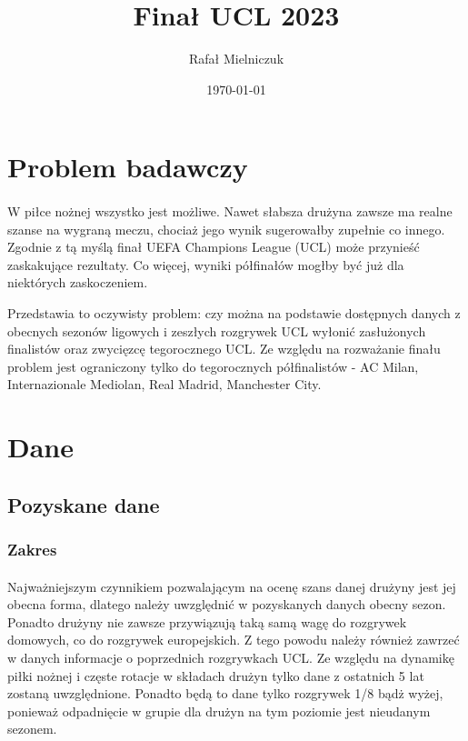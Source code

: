 \documentclass[12pt, letterpaper]{article}
\title{\textbf{Finał UCL 2023}}
\author{Rafał Mielniczuk}
\date{\today}
\begin{document}
\maketitle

\tableofcontents
\pagebreak


\section{Problem badawczy}
\paragraph{} W piłce nożnej wszystko jest możliwe. Nawet słabsza drużyna zawsze ma realne szanse na wygraną meczu, chociaż jego wynik sugerowałby zupełnie co innego. Zgodnie z tą myślą finał UEFA Champions League (UCL) może przynieść zaskakujące rezultaty. Co więcej, wyniki półfinałów mogłby być już dla niektórych zaskoczeniem. \par Przedstawia to oczywisty problem: czy można na podstawie dostępnych danych z obecnych sezonów ligowych i zeszłych rozgrywek UCL wyłonić zasłużonych finalistów oraz zwycięzcę tegorocznego UCL. Ze względu na rozważanie finału problem jest ograniczony tylko do tegorocznych półfinalistów - AC Milan, Internazionale Mediolan, Real Madrid, Manchester City.


\section{Dane}
\subsection{Pozyskane dane}
\subsubsection{Zakres}
\paragraph{} Najważniejszym czynnikiem pozwalającym na ocenę szans danej drużyny jest jej obecna forma, dlatego należy uwzględnić w pozyskanych danych obecny sezon. Ponadto drużyny nie zawsze przywiązują taką samą wagę do rozgrywek domowych, co do rozgrywek europejskich. Z tego powodu należy również zawrzeć w danych informacje o poprzednich rozgrywkach UCL. Ze względu na dynamikę piłki nożnej i częste rotacje w składach drużyn tylko dane z ostatnich 5 lat zostaną uwzględnione. Ponadto będą to dane tylko rozgrywek 1/8 bądż wyżej, ponieważ odpadnięcie w grupie dla drużyn na tym poziomie jest nieudanym sezonem.
\end{document}
